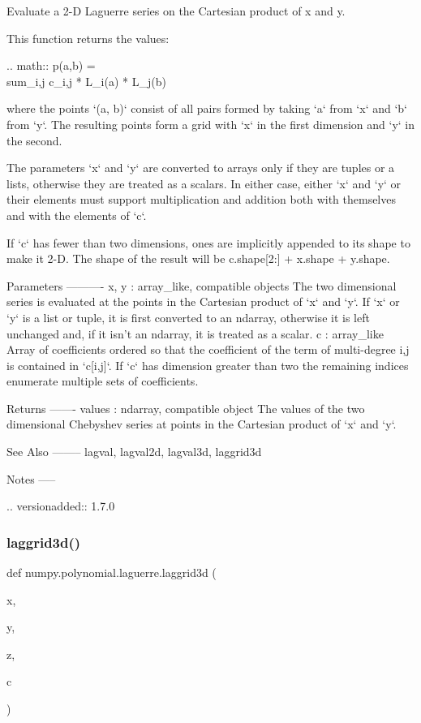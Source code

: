 \begin{DoxyVerb}Evaluate a 2-D Laguerre series on the Cartesian product of x and y.

This function returns the values:

.. math:: p(a,b) = \\sum_{i,j} c_{i,j} * L_i(a) * L_j(b)

where the points `(a, b)` consist of all pairs formed by taking
`a` from `x` and `b` from `y`. The resulting points form a grid with
`x` in the first dimension and `y` in the second.

The parameters `x` and `y` are converted to arrays only if they are
tuples or a lists, otherwise they are treated as a scalars. In either
case, either `x` and `y` or their elements must support multiplication
and addition both with themselves and with the elements of `c`.

If `c` has fewer than two dimensions, ones are implicitly appended to
its shape to make it 2-D. The shape of the result will be c.shape[2:] +
x.shape + y.shape.

Parameters
----------
x, y : array_like, compatible objects
    The two dimensional series is evaluated at the points in the
    Cartesian product of `x` and `y`.  If `x` or `y` is a list or
    tuple, it is first converted to an ndarray, otherwise it is left
    unchanged and, if it isn't an ndarray, it is treated as a scalar.
c : array_like
    Array of coefficients ordered so that the coefficient of the term of
    multi-degree i,j is contained in `c[i,j]`. If `c` has dimension
    greater than two the remaining indices enumerate multiple sets of
    coefficients.

Returns
-------
values : ndarray, compatible object
    The values of the two dimensional Chebyshev series at points in the
    Cartesian product of `x` and `y`.

See Also
--------
lagval, lagval2d, lagval3d, laggrid3d

Notes
-----

.. versionadded:: 1.7.0\end{DoxyVerb}
 \mbox{\label{namespacenumpy_1_1polynomial_1_1laguerre_aba188279f8db273b635c947471cc136a}} 
\subsubsection{\texorpdfstring{laggrid3d()}{laggrid3d()}}
{\footnotesize\ttfamily def numpy.\+polynomial.\+laguerre.\+laggrid3d (\begin{DoxyParamCaption}\item[{}]{x,  }\item[{}]{y,  }\item[{}]{z,  }\item[{}]{c }\end{DoxyParamCaption})}


